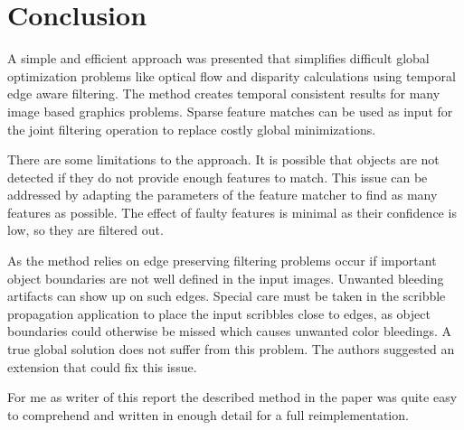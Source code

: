 \section{Conclusion}
A simple and efficient approach was presented that simplifies difficult global
optimization problems like optical flow and disparity calculations using
temporal edge aware filtering. The method creates temporal consistent results
for many image based graphics problems. Sparse feature matches can be used as
input for the joint filtering operation to replace costly global minimizations.

There are some limitations to the approach. It is possible that objects are not
detected if they do not provide enough features to match. This issue can be
addressed by adapting the parameters of the feature matcher to find as many
features as possible. The effect of faulty features is minimal as their
confidence is low, so they are filtered out.

As the method relies on edge preserving filtering problems occur if important
object boundaries are not well defined in the input images. Unwanted bleeding
artifacts can show up on such edges. Special care must be taken in the scribble
propagation application to place the input scribbles close to edges, as object
boundaries could otherwise be missed which causes unwanted color bleedings. A
true global solution does not suffer from this problem. The authors suggested an
extension that could fix this issue.

For me as writer of this report the described method in the paper was quite easy
to comprehend and written in enough detail for a full reimplementation.
